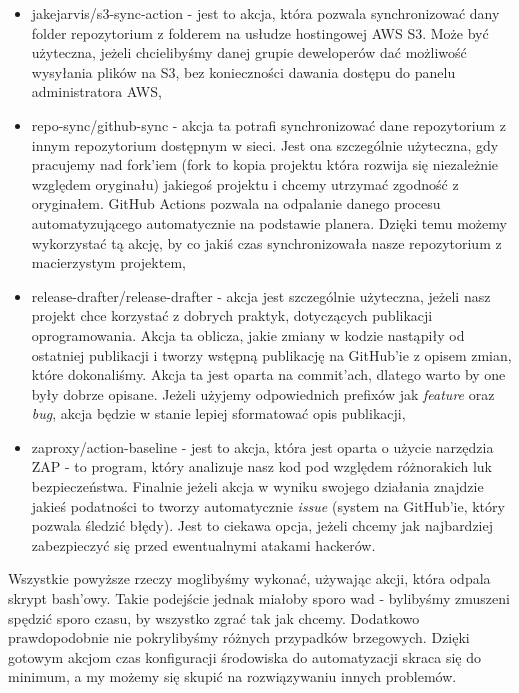 \begin{itemize}
  \item jakejarvis/s3-sync-action - jest to akcja, która pozwala synchronizować dany folder repozytorium z folderem na usłudze hostingowej AWS S3. Może być użyteczna, jeżeli chcielibyśmy danej grupie deweloperów dać możliwość wysyłania plików na S3, bez konieczności dawania dostępu do panelu administratora AWS,
  \item repo-sync/github-sync - akcja ta potrafi synchronizować dane repozytorium z innym repozytorium dostępnym w sieci. Jest ona szczególnie użyteczna, gdy pracujemy nad fork'iem (fork to kopia projektu która rozwija się niezależnie względem oryginału) jakiegoś projektu i chcemy utrzymać zgodność z oryginałem. GitHub Actions pozwala na odpalanie danego procesu automatyzującego automatycznie na podstawie planera. Dzięki temu możemy wykorzystać tą akcję, by co jakiś czas synchronizowała nasze repozytorium z macierzystym projektem,
  \item release-drafter/release-drafter - akcja jest szczególnie użyteczna, jeżeli nasz projekt chce korzystać z dobrych praktyk, dotyczących publikacji oprogramowania. Akcja ta oblicza, jakie zmiany w kodzie nastąpiły od ostatniej publikacji i tworzy wstępną publikację na GitHub'ie z opisem zmian, które dokonaliśmy. Akcja ta jest oparta na commit'ach, dlatego warto by one były dobrze opisane. Jeżeli użyjemy odpowiednich prefixów jak \textit{feature} oraz \textit{bug}, akcja będzie w stanie lepiej sformatować opis publikacji,
  \item zaproxy/action-baseline - jest to akcja, która jest oparta o użycie narzędzia ZAP - to program, który analizuje nasz kod pod względem różnorakich luk bezpieczeństwa. Finalnie jeżeli akcja w wyniku swojego działania znajdzie jakieś podatności to tworzy automatycznie \textit{issue} (system na GitHub'ie, który pozwala śledzić błędy). Jest to ciekawa opcja, jeżeli chcemy jak najbardziej zabezpieczyć się przed ewentualnymi atakami hackerów.
\end{itemize}
Wszystkie powyższe rzeczy moglibyśmy wykonać, używając akcji, która odpala skrypt bash'owy. Takie podejście jednak miałoby sporo wad - bylibyśmy zmuszeni spędzić sporo czasu, by wszystko zgrać tak jak chcemy. Dodatkowo prawdopodobnie nie pokrylibyśmy różnych przypadków brzegowych. Dzięki gotowym akcjom czas konfiguracji środowiska do automatyzacji skraca się do minimum, a my możemy się skupić na rozwiązywaniu innych problemów.




